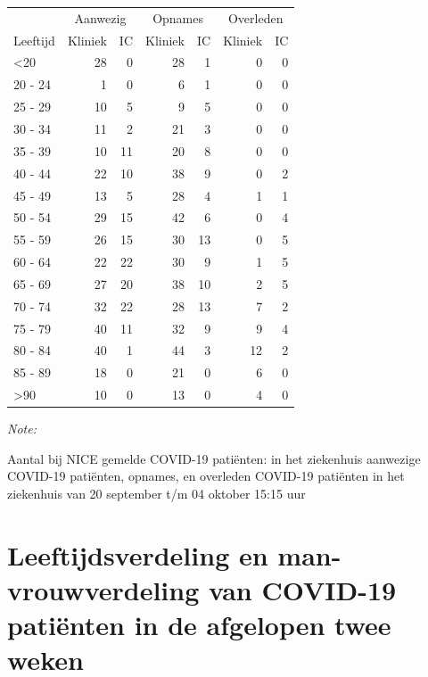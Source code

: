 \documentclass[
  english,
  man,floatsintext]{apa6}
\begin{document}
\begin{table}
\centering\begingroup\fontsize{10}{12}\selectfont

\begin{threeparttable}
\begin{tabular}{lrrrrrr}
\toprule
\multicolumn{1}{c}{ } & \multicolumn{2}{c}{Aanwezig} & \multicolumn{2}{c}{Opnames} & \multicolumn{2}{c}{Overleden} \\
\cmidrule(l{3pt}r{3pt}){2-3} \cmidrule(l{3pt}r{3pt}){4-5} \cmidrule(l{3pt}r{3pt}){6-7}
Leeftijd & Kliniek & IC & Kliniek & IC & Kliniek & IC\\
\midrule
<20 & 28 & 0 & 28 & 1 & 0 & 0\\
20 - 24 & 1 & 0 & 6 & 1 & 0 & 0\\
25 - 29 & 10 & 5 & 9 & 5 & 0 & 0\\
30 - 34 & 11 & 2 & 21 & 3 & 0 & 0\\
35 - 39 & 10 & 11 & 20 & 8 & 0 & 0\\
40 - 44 & 22 & 10 & 38 & 9 & 0 & 2\\
45 - 49 & 13 & 5 & 28 & 4 & 1 & 1\\
50 - 54 & 29 & 15 & 42 & 6 & 0 & 4\\
55 - 59 & 26 & 15 & 30 & 13 & 0 & 5\\
60 - 64 & 22 & 22 & 30 & 9 & 1 & 5\\
65 - 69 & 27 & 20 & 38 & 10 & 2 & 5\\
70 - 74 & 32 & 22 & 28 & 13 & 7 & 2\\
75 - 79 & 40 & 11 & 32 & 9 & 9 & 4\\
80 - 84 & 40 & 1 & 44 & 3 & 12 & 2\\
85 - 89 & 18 & 0 & 21 & 0 & 6 & 0\\
>90 & 10 & 0 & 13 & 0 & 4 & 0\\
\bottomrule
\end{tabular}
\begin{tablenotes}
\item \textit{Note: } 
\item Aantal bij NICE gemelde COVID-19 patiënten: in het ziekenhuis aanwezige COVID-19 patiënten, opnames, en overleden COVID-19 patiënten in het ziekenhuis van 20 september t/m 04 oktober 15:15 uur
\end{tablenotes}
\end{threeparttable}
\endgroup{}
\end{table}

\newpage

\hypertarget{leeftijdsverdeling-en-man-vrouwverdeling-van-covid-19-patiuxebnten-in-de-afgelopen-twee-weken}{%
\section{Leeftijdsverdeling en man-vrouwverdeling van COVID-19 patiënten in de afgelopen twee weken}\label{leeftijdsverdeling-en-man-vrouwverdeling-van-covid-19-patiuxebnten-in-de-afgelopen-twee-weken}}
\end{document}
